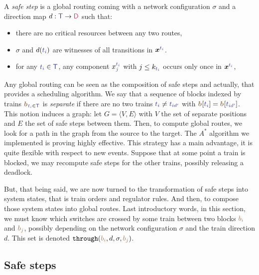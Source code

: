 \documentclass[runningheads]{llncs}
\newcommand{\directions}{\dirFmt{\mathsf{D}}}
\newcommand{\throughS}{{\mathtt{through}}}
\newcommand{\dirFmt}[1]{{\color{dircolor} #1}}
\newcommand{\posFmt}[1]{{\color{poscolor}{#1}}}
\newcommand{\bid}[1]{\ensuremath{\posFmt{b_{#1}}}}
\newcommand{\trainFmt}[1]{{\color{traincolor} #1}}
\newcommand{\trains}{{\trainFmt{\mathsf{T}}}}
\newcommand{\tid}[1]{\ensuremath{\trainFmt{t_{#1}}}}
\begin{document}
A \emph{safe step} is a global routing  coming with a network configuration $\sigma$ and a direction map $d: \trains \to \directions$ such that:
\begin{itemize}
\item there are no critical resources between any two routes,
\item $\sigma$ and $d(\tid{i})$ are witnesses of all transitions in $\vec{x}^\tid{i}$. 
\item for any $\tid{i} \in \trains$, any component $x_j^\tid{i}$ with $j \leq k_{\tid{i}}$ occurs only once in $\vec{x}^{\tid{i}}$,
\end{itemize}

Any global routing can be seen as the composition of safe steps and actually, that provides a scheduling algorithm. We say that a sequence of blocks indexed by trains $\vec{\bid{}}_{\tid{i} \in \trains}$ is \emph{separate} if there are no two trains $\tid{i} \neq \tid{id'}$ with $\vec{\bid{}}[\tid{i}] = \vec{\bid{}}[\tid{id'}]$. This notion induces a graph: let $G = \langle V, E\rangle$ with $V$ the set of separate positions and $E$ the set of safe steps between them.  Then, to compute global routes, we look for a path in the graph from the source to the target. The  $A^*$ algorithm we implemented is proving highly effective. This strategy has a main advantage, it is quite flexible with respect to new events. Suppose that at some point a train is blocked, we may recompute safe steps for the other trains, possibly releasing a deadlock. 

 But, that being said, we are now turned to the transformation of safe steps into system states, that is train orders and regulator rules. And then, to compose those system states into global routes. Last introductory words, in this section, we must know which switches are crossed by some train between two blocks $\bid{i}$ and $\bid{j}$, possibly depending on the network configuration $\sigma$ and the train direction $d$. This set is denoted $\throughS(\bid{i}, d, \sigma, \bid{j})$. 

\subsection{Safe steps}
\label{sec:experiments:4}
\end{document}
